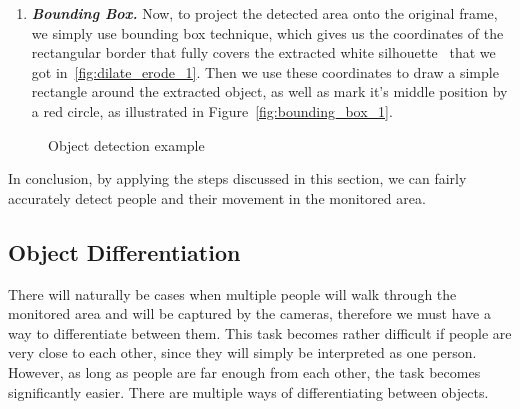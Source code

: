\begin{enumerate}
	\item \textit{\textbf{Bounding Box.}} Now, to project the detected area onto the original frame, we simply use bounding box technique, which gives us the coordinates of the rectangular border that fully covers the extracted white silhouette~\cite{bounding_box_1} that we got in~\ref{fig:dilate_erode_1}. Then we use these coordinates to draw a simple rectangle around the extracted object, as well as mark it's middle position by a red circle, as illustrated in Figure~\ref{fig:bounding_box_1}.
	\end{enumerate}
	\begin{figure}[ht]
		\centering
		\quad
		\quad
		\quad
		\caption{Object detection example}
		\label{fig:object_detection_example}
	\end{figure}
	
	In conclusion, by applying the steps discussed in this section, we can fairly accurately detect people and their movement in the monitored area.
	
	\subsection{Object Differentiation}
	\label{object_differentiation}
	There will naturally be cases when multiple people will walk through the monitored area and will be captured by the cameras, therefore we must have a way to differentiate between them. This task becomes rather difficult if people are very close to each other, since they will simply be interpreted as one person. However, as long as people are far enough from each other, the task becomes significantly easier. There are multiple ways of differentiating between objects. 
	
